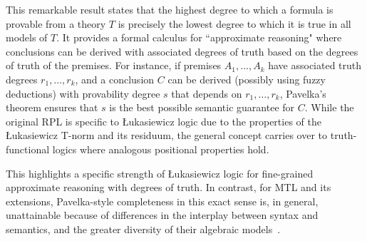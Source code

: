 This remarkable result states that the highest degree to which a formula is provable from a theory $T$ is precisely the lowest degree to which it is true in all models of $T$. It provides a formal calculus for ``approximate reasoning" where conclusions can be derived with associated degrees of truth based on the degrees of truth of the premises. For instance, if premises $A_1, \ldots, A_k$ have associated truth degrees $r_1, \ldots, r_k$, and a conclusion $C$ can be derived (possibly using fuzzy deductions) with provability degree $s$ that depends on $r_1, \ldots, r_k$, Pavelka's theorem ensures that $s$ is the best possible semantic guarantee for $C$. While the original RPL is specific to Łukasiewicz logic due to the properties of the Łukasiewicz T-norm and its residuum, the general concept carries over to truth-functional logics where analogous positional properties hold.

This highlights a specific strength of Łukasiewicz logic for fine-grained approximate reasoning with degrees of truth. In contrast, for MTL and its extensions, Pavelka-style completeness in this exact sense is, in general, unattainable because of differences in the interplay between syntax and semantics, and the greater diversity of their algebraic models~\cite[Rem. 4.1.22, Rem. 4.2.22]{Hajek1998}.
